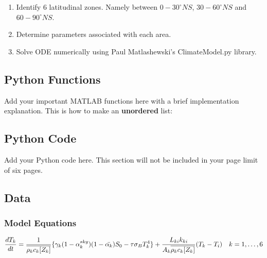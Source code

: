 \documentclass{article}
\newcommand*\mean[1]{\overline{#1}}
\begin{document}
\begin{appendices}
\begin{enumerate}
    \item Identify 6 latitudinal zones. Namely between $0-30^{\circ}NS$, $30-60^{\circ}NS$ and $60-90^{\circ}NS$.
    \item Determine parameters associated with each area.
    \item Solve ODE numerically using Paul Matlashewski's ClimateModel.py library.  
\end{enumerate}

\subsection{Python Functions}
Add your important MATLAB functions here with a brief implementation explanation. This is how to make an \textbf{unordered} list:

\subsection{Python Code}
Add your Python code here. This section will not be included in your page limit of six pages.

\subsection{Data}
\subsubsection{Model Equations}
\label{sec:eqns}
\begin{equation}
    \frac{dT_k}{dt} = \frac{1}{\mean{\rho_kc_k[Z_k]}}\{\gamma_k(1-\alpha_k^{sky})(1-\Bar{\alpha_k})S_0-\tau\sigma_BT_k^{4}\} + \frac{L_{ki}k_{ki}}{{A_k}\mean{\rho_kc_k[Z_k]}}(T_{k}-T_{i}) \quad k=1,\dots,6
    \label{eqn:dtk}
\end{equation}



\end{appendices}
\end{document}

